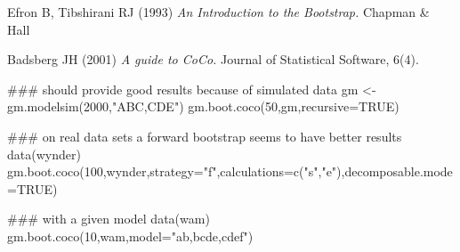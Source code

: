 \begin{References}\relax
Efron B, Tibshirani RJ (1993) 
\emph{An Introduction to the Bootstrap.}
Chapman \& Hall

Badsberg JH (2001) 
\emph{A guide to CoCo.}
Journal of Statistical Software, 6(4).
\end{References}
\begin{SeeAlso}\relax
{}
\end{SeeAlso}
\begin{Examples}
\begin{ExampleCode}
  ### should provide good results because of simulated data
  gm <- gm.modelsim(2000,"ABC,CDE")
  gm.boot.coco(50,gm,recursive=TRUE)
  
  ### on real data sets a forward bootstrap seems to have better results
  data(wynder)
  gm.boot.coco(100,wynder,strategy="f",calculations=c("s","e"),decomposable.mode=TRUE)
  
  ### with a given model
  data(wam)
  gm.boot.coco(10,wam,model="ab,bcde,cdef")
\end{ExampleCode}
\end{Examples}

